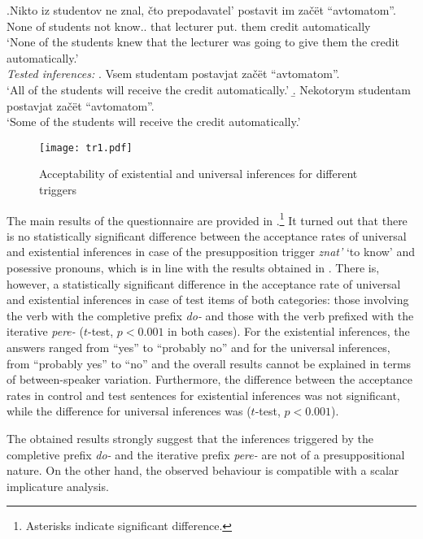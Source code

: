 \exg.\label{ex:znat}Nikto iz studentov ne znal, \v{c}to prepodavatel' postavit im za\v{c}\"{e}t ``avtomatom''.\\
None of students not know.. that lecturer put. them credit automatically\\
\trans `None of the students knew that the lecturer was going to give them the credit automatically.'\smallskip\\
\textit{Tested inferences:}
\a. Vsem studentam postavjat za\v{c}\"et ``avtomatom''.\\
 `All of the students will receive the credit automatically.'
\b. Nekotorym studentam postavjat za\v{c}\"et ``avtomatom''.\\
 `Some of the students will receive the credit automatically.'

\begin{figure}
\texttt{[image: tr1.pdf]}
\caption{Acceptability of existential and universal inferences for different triggers}
\label{fig:results}
\end{figure}

The main results of the questionnaire are provided in .\footnote{Asterisks indicate significant difference.} It turned out that there is no statistically significant difference between the acceptance rates of universal and existential inferences in case of the presupposition trigger \textit{znat'} `to know' and posessive pronouns, which is in line with the results obtained in \citealt{Chemla:09}. There is, however, a statistically significant difference in the acceptance rate of universal and existential inferences in case of test items of both categories: those involving the verb with the completive prefix \textit{do-} and those with the verb prefixed with the iterative \textit{pere-} ($t$-test, $p<0.001$ in both cases). For the existential inferences, the answers ranged from ``yes'' to ``probably no'' and for the universal inferences, from ``probably yes'' to ``no'' and the overall results cannot be explained in terms of between-speaker variation. Furthermore, the difference between the acceptance rates in control and
test sentences for existential inferences was not significant, while the
difference for universal inferences was ($t$-test, $p<0.001$).

The obtained results strongly suggest that the inferences triggered by the completive prefix \textit{do-} and the iterative prefix \textit{pere-} are not of a presuppositional nature. On the other hand, the observed behaviour is compatible with a scalar implicature analysis.

